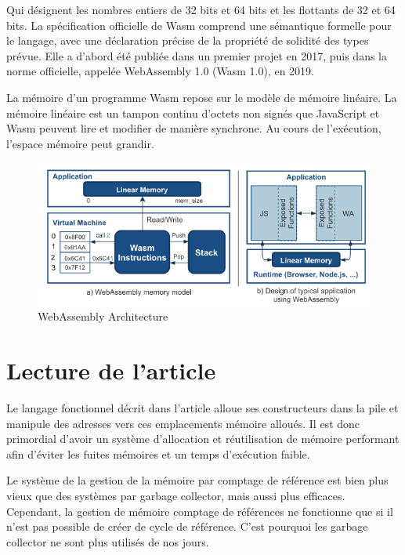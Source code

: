 \documentclass{rapportECL}
\begin{document}
Qui désignent les nombres entiers de 32 bits et 64 bits et les flottants de 32 et 64 bits.  
La spécification officielle de Wasm comprend une sémantique formelle pour le langage, 
avec une déclaration précise de la propriété de solidité des types prévue. 
Elle a d'abord été publiée dans un premier projet en 2017, puis dans la norme officielle, appelée WebAssembly 1.0 (Wasm 1.0), en 2019.
\par La mémoire d’un programme Wasm repose sur le modèle de mémoire linéaire\cite{haas_bringing_2017}. 
La mémoire linéaire est un tampon continu d'octets non signés  que JavaScript et Wasm peuvent lire et modifier de manière synchrone. 
Au cours de l’exécution, l’espace mémoire peut grandir. 

\begin{figure}[ht]
	\centering
	\includegraphics[scale=0.65]{logos/model_memory_wasm.png}	
	\caption{WebAssembly Architecture \cite{noauthor_wasmati_nodate}}
\end{figure}
\FloatBarrier 



\section{Lecture de l'article}
Le langage fonctionnel décrit dans l'article\cite{ullrich_counting_2020} alloue ses constructeurs dans la pile et manipule des 
adresses vers ces emplacements mémoire alloués. Il est donc primordial d'avoir un système d'allocation et réutilisation de 
mémoire performant afin d'éviter les fuites mémoires et un temps d'exécution faible.

Le système de la gestion de la mémoire par comptage de référence est bien plus vieux que des systèmes par garbage collector, 
mais aussi plus efficaces\cite{ullrich_counting_2020}. Cependant, la gestion de mémoire comptage de références ne fonctionne que si 
il n'est pas possible de créer de cycle de référence. 
C'est pourquoi les garbage collector ne sont plus utilisés de nos jours.
\end{document}
